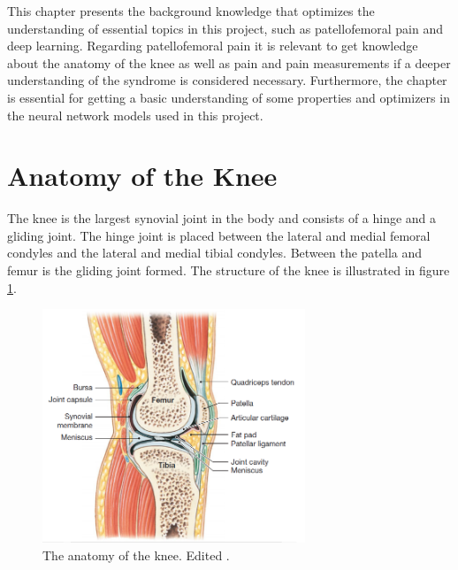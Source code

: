 

This chapter presents the background knowledge that optimizes the understanding of essential topics in this project, such as patellofemoral pain and deep learning. Regarding patellofemoral pain it is relevant to get knowledge about the anatomy of the knee as well as pain and pain measurements if a deeper understanding of the syndrome is considered necessary.  Furthermore, the chapter is essential for getting a basic understanding of some properties and optimizers in the neural network models used in this project.


\section{Anatomy of the Knee}
The knee is the largest synovial joint in the body and consists of a hinge and a gliding joint. The hinge joint is placed between the lateral and medial femoral condyles and the lateral and medial tibial condyles. Between the patella and femur is the gliding joint formed. The structure of the knee is illustrated in figure \ref{fig:bonestruc}.\citep{Martini2012}

\begin{figure} [H]
\centering
\includegraphics[width=0.7\textwidth]{figures/bonestruc}
\caption{The anatomy of the knee. Edited \citep{Martini2012}.}
\label{fig:bonestruc}
\end{figure}

